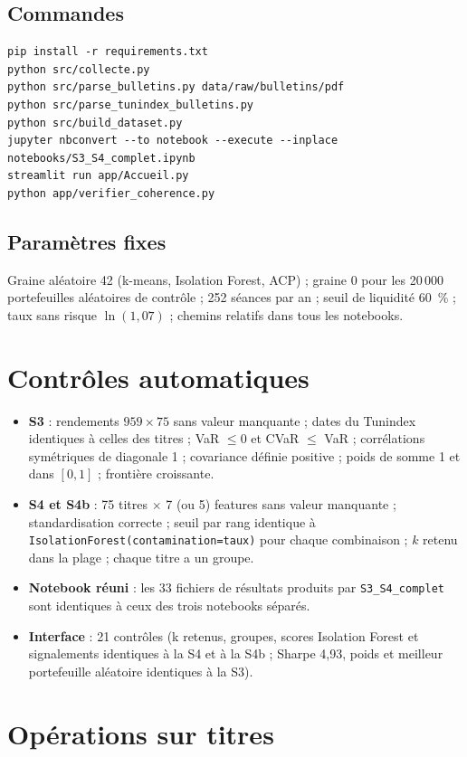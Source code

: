 \documentclass[11pt,a4paper]{article}
\newcommand{\pc}{~\%}
\begin{document}
\subsection*{Commandes}
\begin{verbatim}
pip install -r requirements.txt
python src/collecte.py
python src/parse_bulletins.py data/raw/bulletins/pdf
python src/parse_tunindex_bulletins.py
python src/build_dataset.py
jupyter nbconvert --to notebook --execute --inplace notebooks/S3_S4_complet.ipynb
streamlit run app/Accueil.py
python app/verifier_coherence.py
\end{verbatim}

\subsection*{Paramètres fixes}
Graine aléatoire 42 (k-means, Isolation Forest, ACP) ; graine 0 pour les 20\,000 portefeuilles aléatoires de contrôle ; 252 séances par an ; seuil de liquidité 60\pc{} ; taux sans risque $\ln(1{,}07)$ ; chemins relatifs dans tous les notebooks.

\section{Contrôles automatiques}\label{ann:controles}
\begin{itemize}
  \item \textbf{S3} : rendements $959 \times 75$ sans valeur manquante ; dates du Tunindex identiques à celles des titres ; VaR $\leq 0$ et CVaR $\leq$ VaR ; corrélations symétriques de diagonale 1 ; covariance définie positive ; poids de somme 1 et dans $[0,1]$ ; frontière croissante.
  \item \textbf{S4 et S4b} : 75 titres $\times$ 7 (ou 5) features sans valeur manquante ; standardisation correcte ; seuil par rang identique à \texttt{IsolationForest(contamination=taux)} pour chaque combinaison ; $k$ retenu dans la plage ; chaque titre a un groupe.
  \item \textbf{Notebook réuni} : les 33 fichiers de résultats produits par \texttt{S3\_S4\_complet} sont identiques à ceux des trois notebooks séparés.
  \item \textbf{Interface} : 21 contrôles (k retenus, groupes, scores Isolation Forest et signalements identiques à la S4 et à la S4b ; Sharpe 4,93, poids et meilleur portefeuille aléatoire identiques à la S3).
\end{itemize}

\section{Opérations sur titres}\label{ann:ost}

\end{document}
